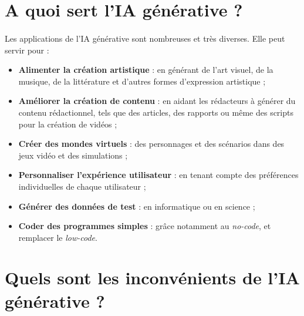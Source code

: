         \section{A quoi sert l'IA générative ?}
            \paragraph{}
                Les applications de l'IA générative sont nombreuses et très diverses. Elle peut servir pour :

                \begin{itemize}[label=--]
                    \item \textbf{Alimenter la création artistique} : en générant de l'art visuel, de la musique, de la littérature et d'autres formes d'expression artistique ;
                    \item \textbf{Améliorer la création de contenu} : en aidant les rédacteurs à générer du contenu rédactionnel, tels que des articles, des rapports ou même des scripts pour la création de vidéos ;
                    \item \textbf{Créer des mondes virtuels} : des personnages et des scénarios dans des jeux vidéo et des simulations ;
                    \item \textbf{Personnaliser l'expérience utilisateur} : en tenant compte des préférences individuelles de chaque utilisateur ;
                    \item \textbf{Générer des données de test} : en informatique ou en science ;
                    \item \textbf{Coder des programmes simples} : grâce notamment au \textit{no-code}, et remplacer le \textit{low-code}.
                \end{itemize}
        \section{Quels sont les inconvénients de l’IA générative ?}
